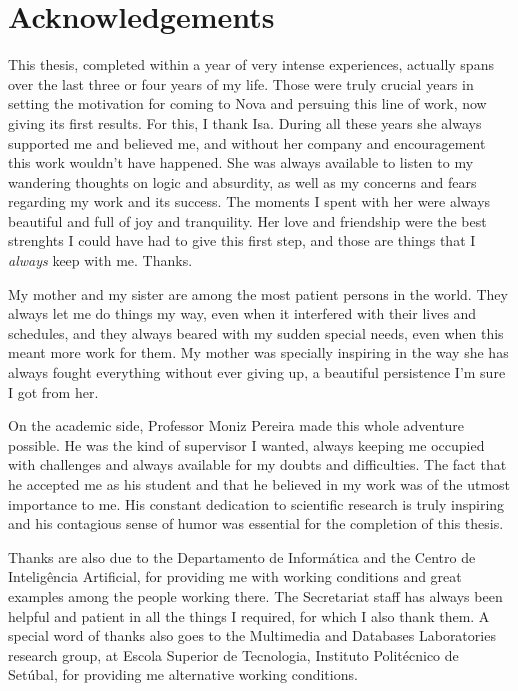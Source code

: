 \chapter*{Acknowledgements}



This thesis, completed within a year of very intense experiences, actually spans over the last three or four years of my life. Those were truly crucial years in setting the motivation for coming to Nova and persuing this line of work, now giving its first results. For this, I thank Isa. During all these years she always supported me and believed me, and without her company and encouragement this work wouldn't have happened. She was always available to listen to my wandering thoughts on logic and absurdity, as well as my concerns and fears regarding my work and its success. The moments I spent with her were always beautiful and full of joy and tranquility. Her love and friendship were the best strenghts I could have had to give this first step, and those are things that I \emph{always} keep with me. Thanks.

My mother and my sister are among the most patient persons in the world. They always let me do things my way, even when it interfered with their lives and schedules, and they always beared with my sudden special needs, even when this meant more work for them. My mother was specially inspiring in the way she has always fought everything without ever giving up, a beautiful persistence I'm sure I got from her.

On the academic side, Professor Moniz Pereira made this whole adventure possible. He was the kind of supervisor I wanted, always keeping me occupied with challenges and always available for my doubts and difficulties. The fact that he accepted me as his student and that he believed in my work was of the utmost importance to me. His constant dedication to scientific research is truly inspiring and his contagious sense of humor was essential for the completion of this thesis.

Thanks are also due to the Departamento de Informática and the Centro de Inteligência Artificial, for providing me with working conditions and great examples among the people working there. The Secretariat staff has always been helpful and patient in all the things I required, for which I also thank them. A special word of thanks also goes to the Multimedia and Databases Laboratories research group, at Escola Superior de Tecnologia, Instituto Politécnico de Setúbal, for providing me alternative working conditions.

